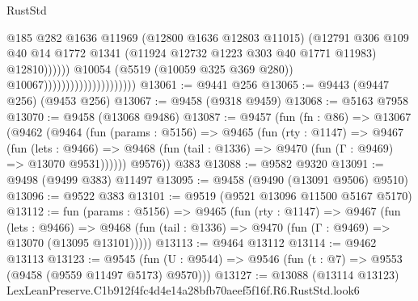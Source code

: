 \begin{lexlean}{RustStd}
\begin{coremodule}
                                                        @185
                                                        @282
                                                        @1636
                                                        @11969
                                                        (@12800 @1636 @12803 @11015)
                                                        (@12791
                                                          @306
                                                          @109
                                                          @40
                                                          @14
                                                          @1772
                                                          @1341
                                                          (@11924
                                                            @12732
                                                            @1223
                                                            @303
                                                            @40
                                                            @1771
                                                            @11983)
                                                          @12810))))))
                                              @10054
                                              (@5519 (@10059 @325 @369 @280))
                                              @10067)))))))))))))))))))))
@13061 := @9441 @256
@13065 := @9443 (@9447 @256) (@9453 @256)
@13067 := @9458 (@9318 @9459)
@13068 := @5163 @7958
@13070 := @9458 (@13068 @9486)
@13087 := @9457
    (fun (fn : @86) =>
    @13067
      (@9462
        (@9464
          (fun (params : @5156) =>
          @9465
            (fun (rty : @1147) =>
            @9467
              (fun (lets : @9466) =>
              @9468 (fun (tail : @1336) => @9470 (fun (Γ : @9469) => @13070 @9531))))))
        @9576))
    @383
@13088 := @9582 @9320
@13091 := @9498 (@9499 @383) @11497
@13095 := @9458 (@9490 (@13091 @9506) @9510)
@13096 := @9522 @383
@13101 := @9519 (@9521 @13096 @11500 @5167 @5170)
@13112 := fun (params : @5156) =>
  @9465
    (fun (rty : @1147) =>
    @9467
      (fun (lets : @9466) =>
      @9468 (fun (tail : @1336) => @9470 (fun (Γ : @9469) => @13070 (@13095 @13101)))))
@13113 := @9464 @13112
@13114 := @9462 @13113
@13123 := @9545
    (fun (U : @9544) => @9546 (fun (t : @7) => @9553 (@9458 (@9559 @11497 @5173) @9570)))
@13127 := @13088 (@13114 @13123) LexLeanPreserve.C1b912f4fc4d4e14a28bfb70aeef5f16f.R6.RustStd.look6

\end{coremodule}
\end{lexlean}
